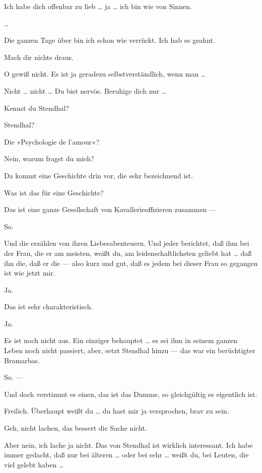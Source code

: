 \documentclass[
	final,
	a4paper,
	ngerman,
	mpinclude = true, %
	twoside = true,
	open = right,
	cleardoublepage = plain,
	DIV = 13,
	BCOR = 1cm,
	titlepage = firstiscover,
	]{scrbook}
\newcommand{\thecharacter}[1]{\textup{\textsc{#1}}}
\newcommand{\theherr}{\thecharacter{Junger Herr}}
\newcommand{\thefrau}{\thecharacter{Junge Frau}}
\newcommand{\character}[1]{\item[#1:]}
\newcommand{\herr}{\character{\theherr}}
\newcommand{\frau}{\character{\thefrau}}
\begin{document}
\begin{play}
	\herr
	Ich habe dich offenbar zu lieb \ldots{} ja \ldots{} ich bin wie von Sinnen.

	\frau
	\ldots{}

	\herr
	Die ganzen Tage über bin ich schon wie verrückt. Ich hab es geahnt.

	\frau
	Mach dir nichts draus.

	\herr
	O gewiß nicht. Es ist ja geradezu selbstverständlich, wenn man \ldots{}

	\frau
	Nicht \ldots{} nicht \ldots{} Du bist nervös. Beruhige dich nur \ldots{}

	\herr
	Kennst du Stendhal?

	\frau
	Stendhal?

	\herr
	Die »Psychologie de l'amour«?

	\frau
	Nein, warum fragst du mich?

	\herr
	Da kommt eine Geschichte drin vor, die sehr bezeichnend ist.

	\frau
	Was ist das für eine Geschichte?

	\herr
	Das ist eine ganze Gesellschaft von Kavallerieoffizieren zusammen ---

	\frau
	So.

	\herr
	Und die erzählen von ihren Liebesabenteuern. Und jeder berichtet, daß ihm bei der Frau, die er am meisten, weißt du, am leidenschaftlichsten geliebt hat \ldots{} daß ihn die, daß er die --- also kurz und gut, daß es jedem bei dieser Frau so gegangen ist wie jetzt mir.

	\frau
	Ja.

	\herr
	Das ist sehr charakteristisch.

	\frau
	Ja.

	\herr
	Es ist noch nicht aus. Ein einziger behauptet \ldots{} es sei ihm in seinem ganzen Leben noch nicht passiert, aber, setzt Stendhal hinzu --- das war ein berüchtigter Bramarbas.

	\frau
	So. ---

	\herr
	Und doch verstimmt es einen, das ist das Dumme, so gleichgültig es eigentlich ist.

	\frau
	Freilich. Überhaupt weißt du \ldots{} du hast mir ja versprochen, brav zu sein.

	\herr
	Geh, nicht lachen, das bessert die Sache nicht.

	\frau
	Aber nein, ich lache ja nicht. Das von Stendhal ist wirklich interessant. Ich habe immer gedacht, daß nur bei älteren \ldots{} oder bei sehr \ldots{} weißt du, bei Leuten, die viel gelebt haben \ldots{}


\end{play}
\end{document}
